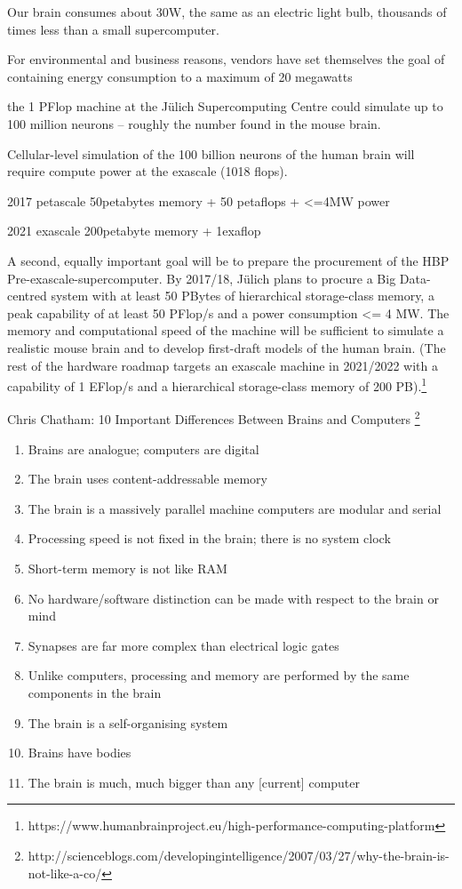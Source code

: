 Our brain consumes about 30W, the same as an electric light bulb, thousands of times less than a small supercomputer. \citep[p.17]{Walker2012}

For environmental and business reasons, vendors have set themselves the goal of containing energy consumption to a maximum of 20 megawatts  \citep[p.41]{Walker2012}

the 1 PFlop machine at the Jülich Supercomputing Centre could simulate up to 100 million neurons – roughly the number found in the mouse brain. \citep[p.41]{Walker2012}

Cellular-level simulation of the 100 billion neurons of the human brain will require compute power at the exascale (1018 flops). \citep[p.41-42]{Walker2012}

2017 petascale 50petabytes memory + 50 petaflops + <=4MW power

2021 exascale 200petabyte memory + 1exaflop

A second, equally important goal will be to prepare the procurement of the HBP Pre-exascale-supercomputer. By 2017/18, Jülich plans to procure a Big Data-centred system with at least 50 PBytes of hierarchical storage-class memory, a peak capability of at least 50 PFlop/s and a power consumption <= 4 MW. The memory and computational speed of the machine will be sufficient to simulate a realistic mouse brain and to develop first-draft models of the human brain. (The rest of the hardware roadmap targets an exascale machine in 2021/2022 with a capability of 1 EFlop/s and a hierarchical storage-class memory of 200 PB).\footnote{https://www.humanbrainproject.eu/high-performance-computing-platform}

Chris Chatham: 10 Important Differences Between Brains and Computers \footnote{http://scienceblogs.com/developingintelligence/2007/03/27/why-the-brain-is-not-like-a-co/}

\begin{enumerate}
\item Brains are analogue; computers are digital
\item The brain uses content-addressable memory
\item The brain is a massively parallel machine computers are modular and serial
\item Processing speed is not fixed in the brain; there is no system clock
\item Short-term memory is not like RAM
\item No hardware/software distinction can be made with respect to the brain or mind
\item Synapses are far more complex than electrical logic gates
\item Unlike computers, processing and memory are performed by the same components in the brain
\item The brain is a self-organising system
\item Brains have bodies
\item	The brain is much, much bigger than any [current] computer
\end{enumerate}

